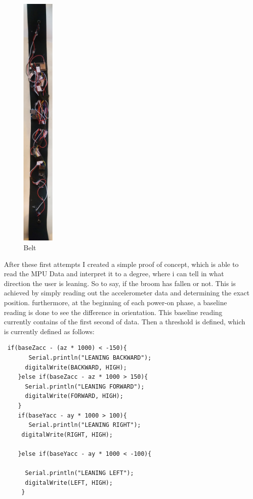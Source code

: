 \begin{figure}
\centering
\includegraphics[width=0.14\textwidth]{images/belt.jpg}
    \caption{Belt}
        \label{fig:Belt}
\end{figure}

After these first attempts I created a simple proof of concept, which is able to read the MPU Data and interpret it to a degree, where i can tell in what direction the user is leaning. So to say, if the broom has fallen or not. This is achieved by simply reading out the accelerometer data and determining the exact position. furthermore, at the beginning of each power-on phase, a baseline reading is done to see the difference in orientation. This baseline reading currently contains of the first second of data. Then a threshold is defined, which is currently defined as follows:

\begin{lstlisting}
 if(baseZacc - (az * 1000) < -150){
       Serial.println("LEANING BACKWARD");
      digitalWrite(BACKWARD, HIGH);
    }else if(baseZacc - az * 1000 > 150){
      Serial.println("LEANING FORWARD");
      digitalWrite(FORWARD, HIGH);
    }
    if(baseYacc - ay * 1000 > 100){
       Serial.println("LEANING RIGHT");
     digitalWrite(RIGHT, HIGH);

    }else if(baseYacc - ay * 1000 < -100){
      
      Serial.println("LEANING LEFT");
      digitalWrite(LEFT, HIGH);
     }
\end{lstlisting}

